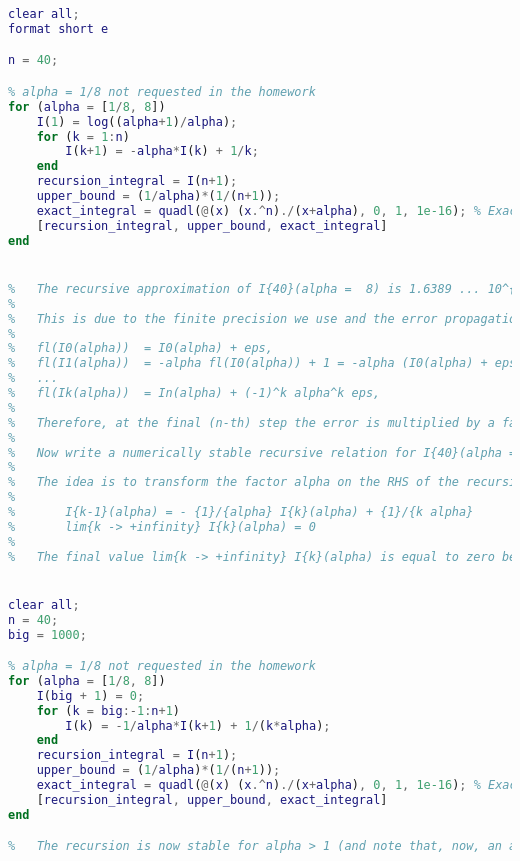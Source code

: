 \documentclass[12pt, a4paper]{report}
\newtheorem[style=M,bodystyle=\normalfont]{theorem}{Theorem}
\newtheorem[style=M,bodystyle=\normalfont]{corollary}{Corollary}
\newtheorem[style=M,bodystyle=\normalfont]{lemma}{Lemma}
\newtheorem[style=M,bodystyle=\normalfont]{definition}{Definition}
\begin{document}
    \begin{Answer}[ref=12]
        \begin{lstlisting}[language=Matlab]
clear all;
format short e

n = 40;

% alpha = 1/8 not requested in the homework
for (alpha = [1/8, 8])
    I(1) = log((alpha+1)/alpha);
    for (k = 1:n)
        I(k+1) = -alpha*I(k) + 1/k;
    end
    recursion_integral = I(n+1);
    upper_bound = (1/alpha)*(1/(n+1));
    exact_integral = quadl(@(x) (x.^n)./(x+alpha), 0, 1, 1e-16); % Exact value (not requested)
    [recursion_integral, upper_bound, exact_integral]
end


% 	The recursive approximation of I{40}(alpha =  8) is 1.6389 ... 10^{18}: this result is for sure incorrect because it violates the upper bound for $I_{40}(\alpha =  8)$.
% 	
% 	This is due to the finite precision we use and the error propagation: the initial value I0(alpha) = ln({alpha+1}/{alpha}) is represented with a certain error eps; denoting by fl(y) the floating point representation of the number y, we have
% 	
% 	fl(I0(alpha))  = I0(alpha) + eps,
% 	fl(I1(alpha))  = -alpha fl(I0(alpha)) + 1 = -alpha (I0(alpha) + eps) + 1 = I1(alpha) - alpha eps,
% 	... 
% 	fl(Ik(alpha))  = In(alpha) + (-1)^k alpha^k eps,
% 	
% 	Therefore, at the final (n-th) step the error is multiplied by a factor alpha^n, which result in an amplification of the error if alpha > 1. Instead, for alpha < 1, the error is damped and the recursive relation is stable (e.g. see the previous test for alpha = 1/8).
% 	
% 	Now write a numerically stable recursive relation for I{40}(alpha =  8).
% 	
% 	The idea is to transform the factor alpha on the RHS of the recursive relation in a factor {1}/{alpha}; this can be achieved inverting the recursive relation:
% 	
% 		I{k-1}(alpha) = - {1}/{alpha} I{k}(alpha) + {1}/{k alpha}
% 		lim{k -> +infinity} I{k}(alpha) = 0
% 		
% 	The final value lim{k -> +infinity} I{k}(alpha) is equal to zero because 0 <= I{k}(alpha) <= {1}/{alpha} {1}/{k+1} -> 0, as k -> + infinity.


clear all;
n = 40;
big = 1000;

% alpha = 1/8 not requested in the homework
for (alpha = [1/8, 8])
    I(big + 1) = 0;
    for (k = big:-1:n+1)
        I(k) = -1/alpha*I(k+1) + 1/(k*alpha);
    end
    recursion_integral = I(n+1);
    upper_bound = (1/alpha)*(1/(n+1));
    exact_integral = quadl(@(x) (x.^n)./(x+alpha), 0, 1, 1e-16); % Exact value (not requested)
    [recursion_integral, upper_bound, exact_integral]
end

%	The recursion is now stable for alpha > 1 (and note that, now, an additional error is present, because the final condition can be set for an arbitrary large k = k* instead of k = +infinity).
        \end{lstlisting}
    \end{Answer}
\end{document}
